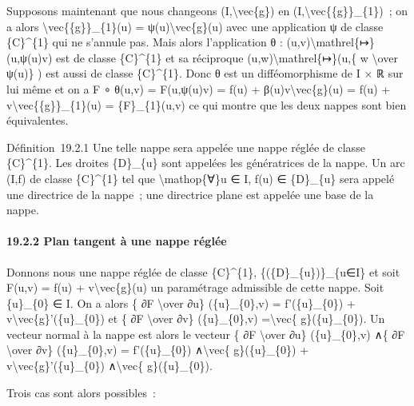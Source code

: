 \documentclass[]{article}
\begin{document}
Supposons maintenant que nous changeons (I,\textbackslash{}vec\{g\}) en
(I,\textbackslash{}vec\{\{g\}\}\_\{1\})~; on a alors
\textbackslash{}vec\{\{g\}\}\_\{1\}(u) = ψ(u)\textbackslash{}vec\{g\}(u)
avec une application ψ de classe \{C\}\^{}\{1\} qui ne s'annule pas.
Mais alors l'application θ : (u,v)\textbackslash{}mathrel\{↦\}(u,ψ(u)v)
est de classe \{C\}\^{}\{1\} et sa réciproque
(u,w)\textbackslash{}mathrel\{↦\}(u,\{ w \textbackslash{}over ψ(u)\} )
est aussi de classe \{C\}\^{}\{1\}. Donc θ est un difféomorphisme de I ×
ℝ sur lui même et on a F ∘ θ(u,v) = F(u,ψ(u)v) = f(u) +
β(u)v\textbackslash{}vec\{g\}(u) = f(u) +
v\textbackslash{}vec\{\{g\}\}\_\{1\}(u) = \{F\}\_\{1\}(u,v) ce qui
montre que les deux nappes sont bien équivalentes.

Définition~19.2.1 Une telle nappe sera appelée une nappe réglée de
classe \{C\}\^{}\{1\}. Les droites \{D\}\_\{u\} sont appelées les
génératrices de la nappe. Un arc (I,f) de classe \{C\}\^{}\{1\} tel que
\textbackslash{}mathop\{∀\}u ∈ I, f(u) ∈ \{D\}\_\{u\} sera appelé une
directrice de la nappe~; une directrice plane est appelée une base de la
nappe.

\paragraph{19.2.2 Plan tangent à une nappe réglée}

Donnons nous une nappe réglée de classe \{C\}\^{}\{1\},
\{(\{D\}\_\{u\})\}\_\{u∈I\} et soit F(u,v) = f(u) +
v\textbackslash{}vec\{g\}(u) un paramétrage admissible de cette nappe.
Soit \{u\}\_\{0\} ∈ I. On a alors \{ ∂F \textbackslash{}over ∂u\}
(\{u\}\_\{0\},v) = f'(\{u\}\_\{0\}) +
v\textbackslash{}vec\{g\}'(\{u\}\_\{0\}) et \{ ∂F \textbackslash{}over
∂v\} (\{u\}\_\{0\},v) =\textbackslash{}vec\{ g\}(\{u\}\_\{0\}). Un
vecteur normal à la nappe est alors le vecteur \{ ∂F
\textbackslash{}over ∂u\} (\{u\}\_\{0\},v) ∧\{ ∂F \textbackslash{}over
∂v\} (\{u\}\_\{0\},v) = f'(\{u\}\_\{0\}) ∧\textbackslash{}vec\{
g\}(\{u\}\_\{0\}) + v\textbackslash{}vec\{g\}'(\{u\}\_\{0\})
∧\textbackslash{}vec\{ g\}(\{u\}\_\{0\}).

Trois cas sont alors possibles~:
\end{document}
